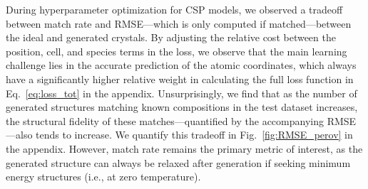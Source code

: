 %

During hyperparameter optimization for CSP models, we observed a tradeoff between match rate and RMSE---which is only computed if matched---between the ideal and generated crystals.
By adjusting the relative cost between the position, cell, and species terms in the loss, we observe that the main learning challenge lies in the accurate prediction of the atomic coordinates, which always have a significantly higher relative weight in calculating the full loss function in Eq.~\ref{eq:loss_tot} in the appendix.
Unsurprisingly, we find that as the number of generated structures matching known compositions in the test dataset increases, the structural fidelity of these matches—quantified by the accompanying RMSE—also tends to increase. We quantify this tradeoff in Fig.~\ref{fig:RMSE_perov} in the appendix. However, match rate remains the primary metric of interest, as the generated structure can always be relaxed after generation if seeking minimum energy structures (i.e., at zero temperature).

